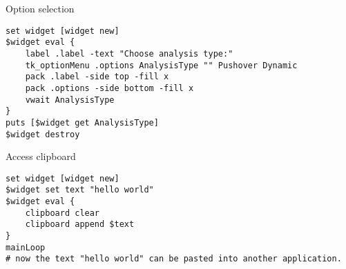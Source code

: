 \documentclass{article}
\renewcommand{\^}[1]{\textsuperscript{#1}}
\renewcommand{\_}[1]{\textsubscript{#1}}
\begin{document}
\begin{example}{Option selection}
\begin{lstlisting}
set widget [widget new]
$widget eval {
	label .label -text "Choose analysis type:"
	tk_optionMenu .options AnalysisType "" Pushover Dynamic
	pack .label -side top -fill x
	pack .options -side bottom -fill x
	vwait AnalysisType
}
puts [$widget get AnalysisType]
$widget destroy
\end{lstlisting}
\end{example}

\begin{example}{Access clipboard}
\begin{lstlisting}
set widget [widget new]
$widget set text "hello world"
$widget eval {
	clipboard clear
	clipboard append $text
}
mainLoop
# now the text "hello world" can be pasted into another application.
\end{lstlisting}
\end{example}
\end{document}
